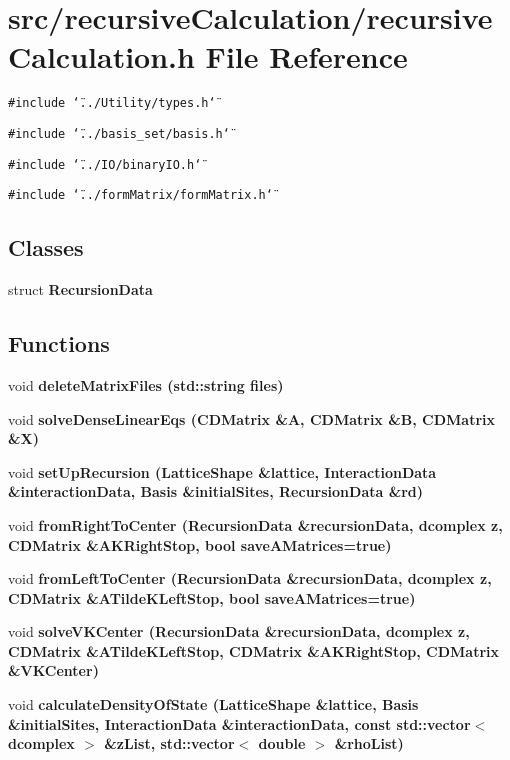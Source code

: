 \section{src/recursive\-Calculation/recursive\-Calculation.h File Reference}
\label{recursiveCalculation_8h}
{\tt \#include \char`\"{}../Utility/types.h\char`\"{}}\par
{\tt \#include \char`\"{}../basis\_\-set/basis.h\char`\"{}}\par
{\tt \#include \char`\"{}../IO/binary\-IO.h\char`\"{}}\par
{\tt \#include \char`\"{}../form\-Matrix/form\-Matrix.h\char`\"{}}\par
\subsection*{Classes}
\begin{CompactItemize}
\item 
struct \bf{Recursion\-Data}
\end{CompactItemize}
\subsection*{Functions}
\begin{CompactItemize}
\item 
void \bf{delete\-Matrix\-Files} (std::string files)
\item 
void \bf{solve\-Dense\-Linear\-Eqs} (\bf{CDMatrix} \&A, \bf{CDMatrix} \&B, \bf{CDMatrix} \&X)
\item 
void \bf{set\-Up\-Recursion} (\bf{Lattice\-Shape} \&lattice, \bf{Interaction\-Data} \&interaction\-Data, \bf{Basis} \&initial\-Sites, \bf{Recursion\-Data} \&rd)
\item 
void \bf{from\-Right\-To\-Center} (\bf{Recursion\-Data} \&recursion\-Data, \bf{dcomplex} z, \bf{CDMatrix} \&AKRight\-Stop, bool save\-AMatrices=true)
\item 
void \bf{from\-Left\-To\-Center} (\bf{Recursion\-Data} \&recursion\-Data, \bf{dcomplex} z, \bf{CDMatrix} \&ATilde\-KLeft\-Stop, bool save\-AMatrices=true)
\item 
void \bf{solve\-VKCenter} (\bf{Recursion\-Data} \&recursion\-Data, \bf{dcomplex} z, \bf{CDMatrix} \&ATilde\-KLeft\-Stop, \bf{CDMatrix} \&AKRight\-Stop, \bf{CDMatrix} \&VKCenter)
\item 
void \bf{calculate\-Density\-Of\-State} (\bf{Lattice\-Shape} \&lattice, \bf{Basis} \&initial\-Sites, \bf{Interaction\-Data} \&interaction\-Data, const std::vector$<$ \bf{dcomplex} $>$ \&z\-List, std::vector$<$ double $>$ \&rho\-List)
\end{CompactItemize}


